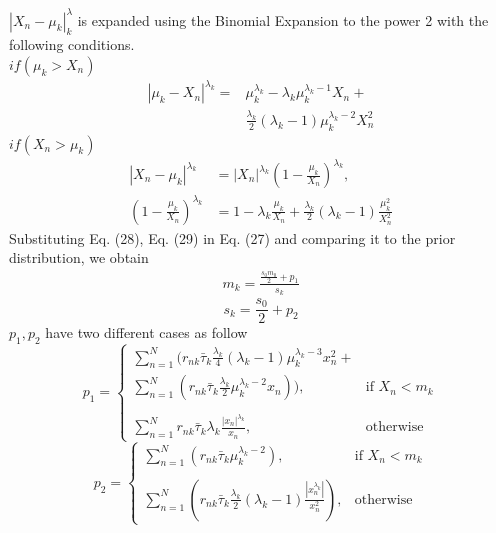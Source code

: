 \documentclass[conference]{IEEEtran}
\begin{document}
    
    $|X_n - \mu_k|^\lambda_k$ is expanded using the Binomial Expansion to the power 2 with the following conditions.\\
    $if(\mu_k > X_n )$
    \begin{equation}
        \begin{split}
            |\mu_k - X_n|^{\lambda_k}=&\mu_k^{\lambda_k} - \lambda_k \mu_k^{\lambda_k - 1} X_n +\\
            &\frac{\lambda_k}{2} (\lambda_k - 1) \mu_k^{\lambda_k - 2} X_n^2
        \end{split}
    \end{equation}
    $if(X_n>\mu_k)$
    \begin{equation}
        \begin{split}
            |X_n-\mu_k|^{\lambda_k} &= |X_n|^{\lambda_k}(1 - \frac{\mu_k}{X_n})^{\lambda_k},\\
            (1 - \frac{\mu_k}{X_n})^{\lambda_k} &= 1 - \lambda_k \frac{\mu_k}{X_n} + \frac{\lambda_k}{2}(\lambda_k-1) \frac{\mu_k^2}{X_n^2}
        \end{split}
    \end{equation}
    Substituting Eq. (28), Eq. (29) in Eq. (27) and comparing it to the prior distribution, we obtain
    \begin{equation}
        \begin{split}\label{mk}
            m_k = \frac{\frac{s_0m_0}{2} + p_1}
            {s_k}
        \end{split}
    \end{equation}
    \begin{equation}\label{sk}
        s_k = \frac{s_0}{2} + p_2
    \end{equation}
$p_1, p_2 $ have two different cases as follow
\[
    p_1= 
\begin{cases}
    \sum_{{n=1}}^{N}(r_{nk}\bar{\tau}_k\frac{\lambda_k}{4}(\lambda_k-1)\mu_k^{\lambda_k-3} x_n^2 + \\ 
        \sum_{{n=1}}^{N}(r_{nk}\bar{\tau}_k\frac{\lambda_k}{2}\mu_k^{\lambda_k-2}x_n))     ,& \text{if } X_n < m_k\\ \\
        \sum_{n=1}^{N}r_{nk}\bar{\tau}_k\lambda_k\frac{|x_n|^{\lambda_k}}{x_n},              & \text{otherwise}
\end{cases}
\]
\[
        p_2= 
    \begin{cases}
        \sum_{{n=1}}^{N}(r_{nk}\bar{\tau}_k\mu_k^{\lambda_k-2}),& \text{if } X_n < m_k\\ \\
        \sum_{{n=1}}^{N}(r_{nk}\bar{\tau}_k\frac{\lambda_k}{2}(\lambda_k-1)\frac{|x_n^{\lambda_k}|}{x_n^2}),              & \text{otherwise}
    \end{cases}
    \]
\end{document}
